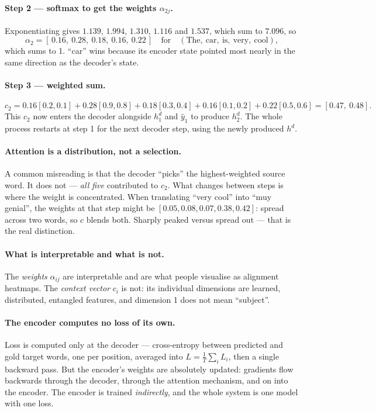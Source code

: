 \documentclass[11pt,a4paper]{article}
\begin{document}
\paragraph{Step 2 --- softmax to get the weights $\alpha_{2j}$.}
Exponentiating gives $1.139$, $1.994$, $1.310$, $1.116$ and $1.537$, which sum to $7.096$, so
\[
\alpha_2 = [\,0.16,\ 0.28,\ 0.18,\ 0.16,\ 0.22\,]
\quad\text{for}\quad
(\text{The},\ \text{car},\ \text{is},\ \text{very},\ \text{cool}),
\]
which sums to 1. ``car'' wins because its encoder state pointed most nearly in the same
direction as the decoder's state.

\paragraph{Step 3 --- weighted sum.}
\[
c_2 = 0.16[0.2,0.1] + 0.28[0.9,0.8] + 0.18[0.3,0.4] + 0.16[0.1,0.2] + 0.22[0.5,0.6]
    = [0.47,\ 0.48].
\]
This $c_2$ now enters the decoder alongside $h_1^d$ and $\hat{y}_1$ to produce $h_2^d$. The
whole process restarts at step 1 for the next decoder step, using the newly produced $h^d$.

\paragraph{Attention is a distribution, not a selection.} A common misreading is that the
decoder ``picks'' the highest-weighted source word. It does not --- \emph{all five}
contributed to $c_2$. What changes between steps is where the weight is concentrated. When
translating ``very cool'' into ``muy genial'', the weights at that step might be
$[0.05, 0.08, 0.07, 0.38, 0.42]$: spread across two words, so $c$ blends both. Sharply peaked
versus spread out --- that is the real distinction.

\paragraph{What is interpretable and what is not.} The \emph{weights} $\alpha_{ij}$ are
interpretable and are what people visualise as alignment heatmaps. The \emph{context vector}
$c_i$ is not: its individual dimensions are learned, distributed, entangled features, and
dimension 1 does not mean ``subject''.

\paragraph{The encoder computes no loss of its own.} Loss is computed only at the decoder ---
cross-entropy between predicted and gold target words, one per position, averaged into
$L = \frac{1}{T}\sum_i L_i$, then a single backward pass. But the encoder's weights are
absolutely updated: gradients flow backwards through the decoder, through the attention
mechanism, and on into the encoder. The encoder is trained \emph{indirectly}, and the whole
system is one model with one loss.
\end{document}
